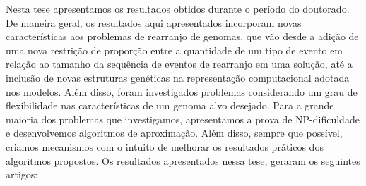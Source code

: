 
Nesta tese apresentamos os resultados obtidos durante o período do doutorado. De maneira geral, os resultados aqui apresentados incorporam novas características aos problemas de rearranjo de genomas, que vão desde a adição de uma nova restrição de proporção entre a quantidade de um tipo de evento em relação ao tamanho da sequência de eventos de rearranjo em uma solução, até a inclusão de novas estruturas genéticas na representação computacional adotada nos modelos. Além disso, foram investigados problemas considerando um grau de flexibilidade nas características de um genoma alvo desejado. Para a grande maioria dos problemas que investigamos, apresentamos a prova de NP-dificuldade e desenvolvemos algoritmos de aproximação. Além disso, sempre que possível, criamos mecanismos com o intuito de melhorar os resultados práticos dos algoritmos propostos. Os resultados apresentados nessa tese, geraram os seguintes artigos:


